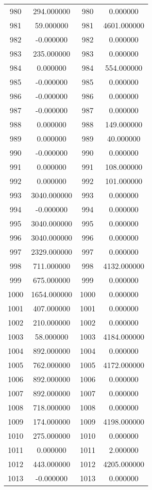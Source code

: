 \documentclass[12pt]{article}
\begin{document}
\begin{longtable}{@{}cccc@{}}
980 & 294.000000 & 980 & 0.000000 \\
981 & 59.000000 & 981 & 4601.000000 \\
982 & -0.000000 & 982 & 0.000000 \\
983 & 235.000000 & 983 & 0.000000 \\
984 & 0.000000 & 984 & 554.000000 \\
985 & -0.000000 & 985 & 0.000000 \\
986 & -0.000000 & 986 & 0.000000 \\
987 & -0.000000 & 987 & 0.000000 \\
988 & 0.000000 & 988 & 149.000000 \\
989 & 0.000000 & 989 & 40.000000 \\
990 & -0.000000 & 990 & 0.000000 \\
991 & 0.000000 & 991 & 108.000000 \\
992 & 0.000000 & 992 & 101.000000 \\
993 & 3040.000000 & 993 & 0.000000 \\
994 & -0.000000 & 994 & 0.000000 \\
995 & 3040.000000 & 995 & 0.000000 \\
996 & 3040.000000 & 996 & 0.000000 \\
997 & 2329.000000 & 997 & 0.000000 \\
998 & 711.000000 & 998 & 4132.000000 \\
999 & 675.000000 & 999 & 0.000000 \\
1000 & 1654.000000 & 1000 & 0.000000 \\
1001 & 407.000000 & 1001 & 0.000000 \\
1002 & 210.000000 & 1002 & 0.000000 \\
1003 & 58.000000 & 1003 & 4184.000000 \\
1004 & 892.000000 & 1004 & 0.000000 \\
1005 & 762.000000 & 1005 & 4172.000000 \\
1006 & 892.000000 & 1006 & 0.000000 \\
1007 & 892.000000 & 1007 & 0.000000 \\
1008 & 718.000000 & 1008 & 0.000000 \\
1009 & 174.000000 & 1009 & 4198.000000 \\
1010 & 275.000000 & 1010 & 0.000000 \\
1011 & 0.000000 & 1011 & 2.000000 \\
1012 & 443.000000 & 1012 & 4205.000000 \\
1013 & -0.000000 & 1013 & 0.000000 \\

\end{longtable}
\end{document}
